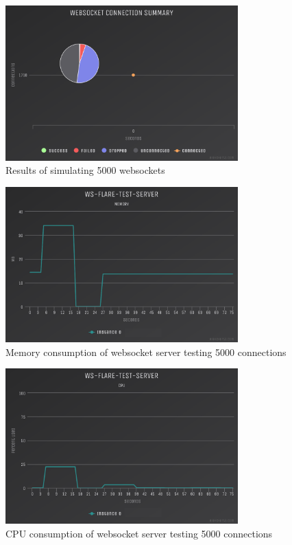 \begin{figure}[H]
  \centering
    \includegraphics[width=0.8\textwidth]{figures/experiments/experiment-1/node-js/conn-summary-5000.png}
    \caption{Results of simulating 5000 websockets}
    \label{fig:experiment-1-conn-summary-5000}
\end{figure}

\begin{figure}[H]
  \centering
    \includegraphics[width=0.8\textwidth]{figures/experiments/experiment-1/node-js/memory-5000.png}
    \caption{Memory consumption of websocket server testing 5000 connections}
    \label{fig:experiment-1-memory-5000}
\end{figure}

\begin{figure}[H]
  \centering
    \includegraphics[width=0.8\textwidth]{figures/experiments/experiment-1/node-js/cpu-5000.png}
    \caption{CPU consumption of websocket server testing 5000 connections}
    \label{fig:experiment-1-cpu-5000}
\end{figure}

